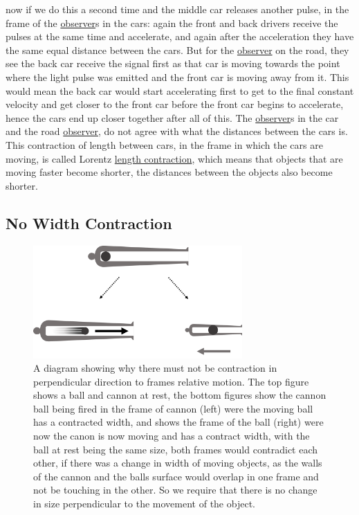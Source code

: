 now if we do this a second time and the middle car releases another pulse, in the frame of the \hyperlink{def-observer}{observer}s in the cars: again the front and back drivers receive the pulses at the same time and accelerate, and again after the acceleration they have the same equal distance between the cars. But for the \hyperlink{def-observer}{observer} on the road, they see the back car receive the signal first as that car is moving towards the point where the light pulse was emitted and the front car is moving away from it. This would mean the back car would start accelerating first to get to the final constant velocity and get closer to the front car before the front car begins to accelerate, hence the cars end up closer together after all of this. The \hyperlink{def-observer}{observer}s in the car and the road \hyperlink{def-observer}{observer}, do not agree with what the distances between the cars is. This contraction of length between cars, in the frame in which the cars are moving, is called Lorentz \hyperlink{def-length-contraction}{length contraction}, which means that objects that are moving faster become shorter, the distances between the objects also become shorter.



\subsection{No Width Contraction} \label{width contraction}

\begin{figure}[H]
	\centering
	\includegraphics[width=8cm]{images/pdf/Cannon_Balls.pdf}
	\caption{A diagram showing why there must not be contraction in perpendicular direction to frames relative motion. The top figure shows a ball and cannon at rest, the bottom figures show the cannon ball being fired in the frame of cannon (left) were the moving ball has a contracted width, and shows the frame of the ball (right) were now the canon is now moving and has a contract width, with the ball at rest being the same size, both frames would contradict each other, if there was a change in width of moving objects, as the walls of the cannon and the balls surface would overlap in one frame and not be touching in the other. So we require that there is no change in size perpendicular to the movement of the object.}
	\label{fig: Cannonball}
\end{figure}


